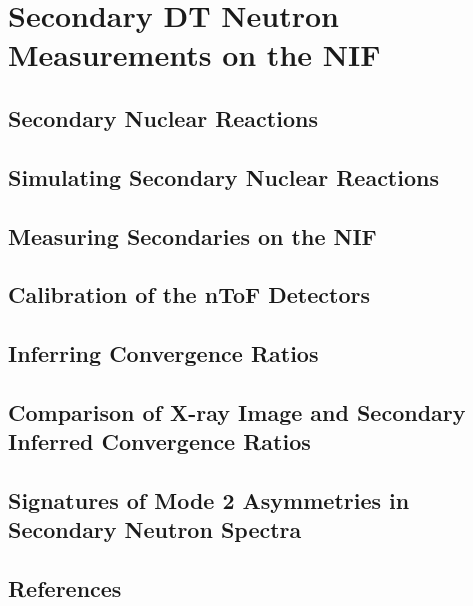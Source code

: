 \chapter{Secondary DT Neutron Measurements on the NIF}
\label{chap:secondaries}

\section{Secondary Nuclear Reactions}
\label{sec:SecondaryNuclearReactionsIntro}


\section{Simulating Secondary Nuclear Reactions}
\label{sec:SimulatingSecondaryReactions}


\section{Measuring Secondaries on the NIF}
\label{sec:MeasuringSecondaries}


\section{Calibration of the nToF Detectors}
\label{sec:NTOFCalibrations}


\section{Inferring Convergence Ratios}
\label{sec:InferringCR}


\section{Comparison of X-ray Image and Secondary Inferred Convergence Ratios}
\label{sec:XrayComparison}


\section{Signatures of Mode 2 Asymmetries in Secondary Neutron Spectra}
\label{sec:mode2Asymmetry}


\section*{References}

